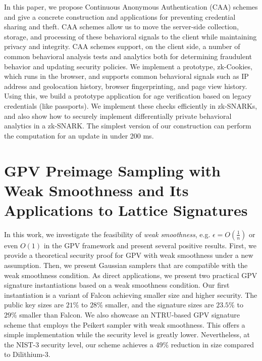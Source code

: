 \documentclass[11pt,oneside]{book}
\theoremstyle{definition}
\theoremstyle{remark}
\theoremstyle{plain}
\begin{document}
In this paper, we propose Continuous Anonymous Authentication (CAA) schemes and give a concrete construction and applications for preventing credential sharing and theft. CAA schemes allow us to move the server-side collection, storage, and processing of these behavioral signals to the client while maintaining privacy and integrity. CAA schemes support, on the client side, a number of common behavioral analysis tests and analytics both for determining fraudulent behavior and updating security policies. We implement a prototype, zk-Cookies, which runs in the browser, and supports common behavioral signals such as IP address and geolocation history, browser fingerprinting, and page view history. Using this, we build a prototype application for age verification based on legacy credentials (like passports). We implement these checks efficiently in zk-SNARKs, and also show how to securely implement differentially private behavioral analytics in a zk-SNARK. The simplest version of our construction can perform the computation for an update in under 200 ms.

\section{\cite{cryptoeprint:2025/1940} GPV Preimage Sampling with Weak Smoothness and Its Applications to Lattice Signatures}
In this work, we investigate the feasibility of \emph{weak smoothness}, e.g. $\epsilon = O(\frac{1}{n})$ or even $O(1)$ in the GPV framework and present several positive results. First, we provide a theoretical security proof for GPV with weak smoothness under a new assumption. Then, we present Gaussian samplers that are compatible with the weak smoothness condition. As direct applications, we present two practical GPV signature instantiations based on a weak smoothness condition. Our first instantiation is a variant of Falcon achieving smaller size and higher security. The public key sizes are $21\%$ to $28\%$ smaller, and the signature sizes are $23.5\%$ to $29\%$ smaller than Falcon. We also showcase an NTRU-based GPV signature scheme that employs the Peikert sampler with weak smoothness. This offers a simple implementation while the security level is greatly lower. Nevertheless, at the NIST-3 security level, our scheme achieves a $49\%$ reduction in size compared to Dilithium-3.
\end{document}
